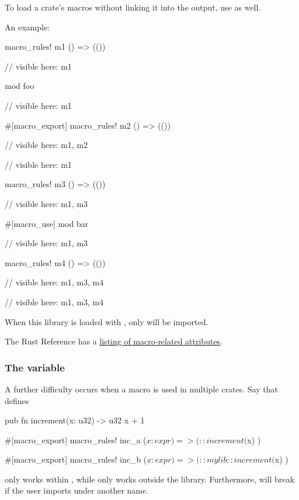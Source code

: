 \blank

To load a crate's macros without linking it into the output, use \code{\#[no\_link]} as well.

\blank

An example:

\begin{rustc}
macro_rules! m1 { () => (()) }

// visible here: m1

mod foo {
    // visible here: m1

    #[macro_export]
    macro_rules! m2 { () => (()) }

    // visible here: m1, m2
}

// visible here: m1

macro_rules! m3 { () => (()) }

// visible here: m1, m3

#[macro_use]
mod bar {
    // visible here: m1, m3

    macro_rules! m4 { () => (()) }

    // visible here: m1, m3, m4
}

// visible here: m1, m3, m4
\end{rustc}

When this library is loaded with , only  will be imported.

\blank

The Rust Reference has a \href{https://doc.rust-lang.org/reference.html\#macro-related-attributes}{listing of macro-related attributes}.

\subsubsection*{The variable }

A further difficulty occurs when a macro is used in multiple crates. Say that  defines

\begin{rustc}
pub fn increment(x: u32) -> u32 {
    x + 1
}

#[macro_export]
macro_rules! inc_a {
    ($x:expr) => ( ::increment($x) )
}

#[macro_export]
macro_rules! inc_b {
    ($x:expr) => ( ::mylib::increment($x) )
}
\end{rustc}

 only works within , while  only works outside the library. Furthermore,  will break 
if the user imports  under another name.

